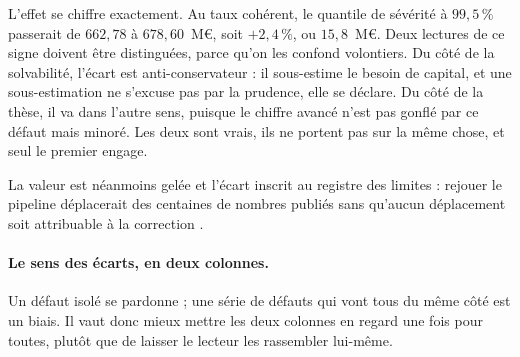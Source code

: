 L'effet se chiffre exactement. Au taux cohérent, le quantile de sévérité à $99{,}5\,\%$ passerait
de $662{,}78$ à $678{,}60$~M\euro, soit $+2{,}4\,\%$, ou $15{,}8$~M\euro. Deux lectures de ce signe
doivent être distinguées, parce qu'on les confond volontiers. Du côté de la solvabilité, l'écart
est anti-conservateur : il sous-estime le besoin de capital, et une sous-estimation ne s'excuse
pas par la prudence, elle se déclare. Du côté de la thèse, il va dans l'autre sens, puisque le
chiffre avancé n'est pas gonflé par ce défaut mais minoré. Les deux sont vrais, ils ne portent
pas sur la même chose, et seul le premier engage.

La valeur est néanmoins gelée et l'écart inscrit au registre des limites : rejouer le pipeline
déplacerait des centaines de nombres publiés sans qu'aucun déplacement soit attribuable à la
correction \matcomp.

\paragraph{Le sens des écarts, en deux colonnes.} Un défaut isolé se pardonne ; une série de
défauts qui vont tous du même côté est un biais. Il vaut donc mieux mettre les deux colonnes
en regard une fois pour toutes, plutôt que de laisser le lecteur les rassembler lui-même.

